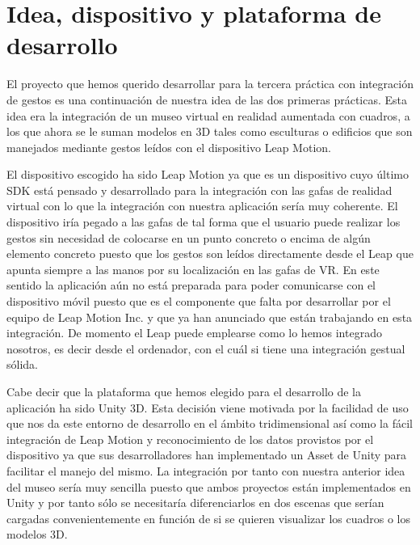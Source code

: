 \documentclass[a4paper,11pt]{article}
\begin{document}
\newpage

\tableofcontents

\newpage

\section{Idea, dispositivo y plataforma de desarrollo}

El proyecto que hemos querido desarrollar para la tercera práctica con integración de gestos es una continuación de nuestra idea de las dos primeras prácticas. Esta idea era la integración de un museo virtual en realidad aumentada con cuadros, a los que ahora se le suman modelos en 3D tales como esculturas o edificios que son manejados mediante gestos leídos con el dispositivo Leap Motion.

\vspace{10px}

El dispositivo escogido ha sido Leap Motion ya que es un dispositivo cuyo último SDK está pensado y desarrollado para la integración con las gafas de realidad virtual con lo que la integración con nuestra aplicación sería muy coherente. El dispositivo iría pegado a las gafas de tal forma que el usuario puede realizar los gestos sin necesidad de colocarse en un punto concreto o encima de algún elemento concreto puesto que los gestos son leídos directamente desde el Leap que apunta siempre a las manos por su localización en las gafas de VR. En este sentido la aplicación aún no está preparada para poder comunicarse con el dispositivo móvil puesto que es el componente que falta por desarrollar por el equipo de Leap Motion Inc. y que ya han anunciado que están trabajando en esta integración. De momento el Leap puede emplearse como lo hemos integrado nosotros, es decir desde el ordenador, con el cuál si tiene una integración gestual sólida.

\vspace{10px}

Cabe decir que la plataforma que hemos elegido para el desarrollo de la aplicación ha sido Unity 3D. Esta decisión viene motivada por la facilidad de uso que nos da este entorno de desarrollo en el ámbito tridimensional así como la fácil integración de Leap Motion y reconocimiento de los datos provistos por el dispositivo ya que sus desarrolladores han implementado un Asset de Unity para facilitar el manejo del mismo. La integración por tanto con nuestra anterior idea del museo sería muy sencilla puesto que ambos proyectos están implementados en Unity y por tanto sólo se necesitaría diferenciarlos en dos escenas que serían cargadas convenientemente en función de si se quieren visualizar los cuadros o los modelos 3D.
\end{document}
